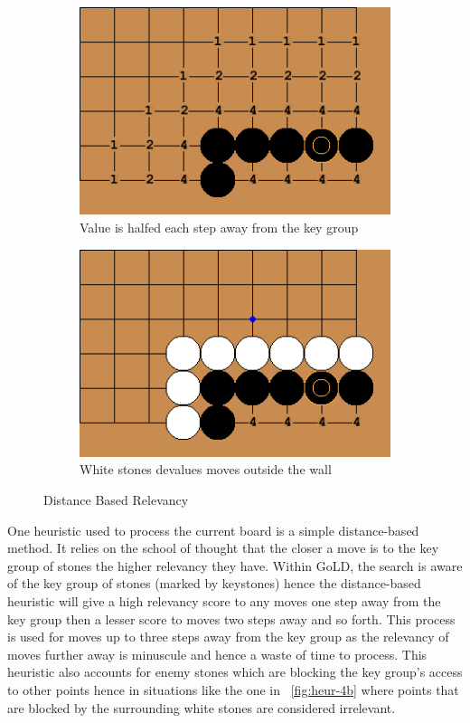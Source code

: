 \documentclass{l4proj}
\begin{document}
\begin{figure}[!ht]
\centering
\begin{subfigure}[b]{0.45\textwidth}
\centering
\includegraphics[width=\textwidth]{heur/4a.png}
\caption{Value is halfed each step away from the key group}
\label{fig:heur-4a}
\end{subfigure}
\begin{subfigure}[b]{0.45\textwidth}
\centering
\includegraphics[width=\textwidth]{heur/4b.png}
\caption{White stones devalues moves outside the wall}
\label{fig:heur-4b}
\end{subfigure}
\caption{Distance Based Relevancy}
\label{fig:heur-4}
\end{figure}

One heuristic used to process the current board is a simple distance-based method. It relies on the school of thought that the closer a move is to the key group of stones the higher relevancy they have. Within GoLD, the search is aware of the key group of stones (marked by keystones) hence the distance-based heuristic will give a high relevancy score to any moves one step away from the key group then a lesser score to moves two steps away and so forth. This process is used for moves up to three steps away from the key group as the relevancy of moves further away is minuscule and hence a waste of time to process. This heuristic also accounts for enemy stones which are blocking the key group's access to other points hence in situations like the one in ~\autoref{fig:heur-4b} where points that are blocked by the surrounding white stones are considered irrelevant.
\end{document}
